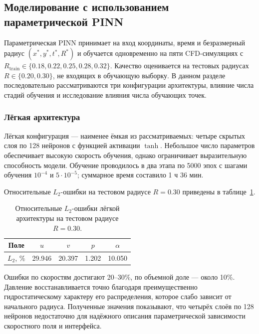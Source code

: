 \documentclass[12pt,a4paper]{article}
\begin{document}
\subsection{Моделирование с использованием параметрической PINN}

Параметрическая PINN принимает на вход координаты, время и безразмерный
радиус \((x^*,y^*,t^*,R^*)\) и обучается одновременно на пяти CFD-симуляциях
с \(R_{\mathrm{train}}\in\{0.18,0.22,0.25,0.28,0.32\}\). Качество оценивается
на тестовых радиусах \(R\in\{0.20,0.30\}\), не входящих в обучающую выборку.
В данном разделе последовательно рассматриваются три конфигурации архитектуры,
влияние числа стадий обучения и исследование влияния числа обучающих точек.

\subsubsection{Лёгкая архитектура}

Лёгкая конфигурация --- наименее ёмкая из рассматриваемых: четыре скрытых
слоя по 128 нейронов с функцией активации \(\tanh\). Небольшое число
параметров обеспечивает высокую скорость обучения, однако ограничивает
выразительную способность модели. Обучение проводилось в два этапа по 5000
эпох с шагами обучения \(10^{-4}\) и \(5\cdot10^{-5}\); суммарное время
составило 1 ч 36 мин.

Относительные \(L_2\)-ошибки на тестовом радиусе \(R=0.30\) приведены в
таблице~\ref{tab:light_errors}.

\begin{table}[H]
    \centering
    \begin{tabular}{c|cccc}
        \hline
        Поле & \(u\) & \(v\) & \(p\) & \(\alpha\) \\
        \hline
        \(L_2\), \% & 29.946 & 20.397 & 1.202 & 10.050 \\
        \hline
    \end{tabular}
    \caption{Относительные \(L_2\)-ошибки лёгкой архитектуры на тестовом радиусе \(R=0.30\).}
    \label{tab:light_errors}
\end{table}

Ошибки по скоростям достигают 20--30\%, по объемной доле --- около 10\%.
Давление восстанавливается точно благодаря преимущественно гидростатическому
характеру его распределения, которое слабо зависит от начального радиуса.
Полученные значения показывают, что четырёх слоёв по 128 нейронов недостаточно
для надёжного описания параметрической зависимости скоростного поля и
интерфейса.
\end{document}
